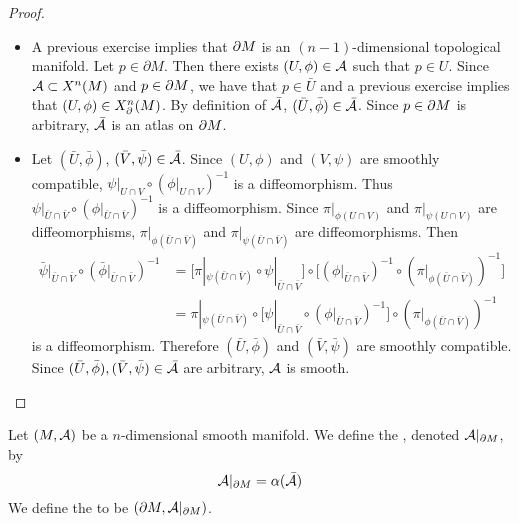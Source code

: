 \documentclass{book}
\begin{document}
\begin{proof}\
	\begin{itemize}
		\item A previous exercise implies that $\partial M$ is an $(n-1)$-dimensional topological manifold. Let $p \in \partial M$. Then there exists $(U, \phi) \in \mathcal{A}$ such that $p \in U$. Since $\mathcal{A} \subset X^n(M)$ and $p \in \partial M$, we have that $p \in \bar{U}$ and a previous exercise implies that $(U, \phi) \in X^n_{\partial}(M)$. By definition of $\bar{\mathcal{A}}$, $(\bar{U}, \bar{\phi}) \in \bar{\mathcal{A}}$. Since $p \in \partial M$ is arbitrary, $\bar{\mathcal{A}}$ is an atlas on $\partial M$. 
		
		
		\item Let $(\bar{U}, \bar{\phi})$, $(\bar{V}, \bar{\psi}) \in \bar{\mathcal{A}}$. Since $(U, \phi)$ and $(V, \psi)$ are smoothly compatible, $\psi|_{U \cap V} \circ (\phi|_{U \cap V})^{-1}$ is a diffeomorphism. Thus $\psi|_{\bar{U} \cap \bar{V}} \circ (\phi|_{\bar{U} \cap \bar{V}})^{-1}$ is a diffeomorphism. Since $\pi|_{\phi(U \cap V)}$ and $\pi|_{\psi(U \cap V)}$ are diffeomorphisms, $\pi|_{\phi(\bar{U} \cap \bar{V})}$ and $\pi|_{\psi(\bar{U} \cap \bar{V})}$ are diffeomorphisms. Then 
		\begin{align*}
			\bar{\psi}|_{\bar{U} \cap \bar{V}} \circ (\bar{\phi}|_{\bar{U} \cap \bar{V}})^{-1}
			& = \bigg[ \pi|_{\psi(\bar{U} \cap \bar{V})} \circ \psi|_{\bar{U} \cap \bar{V}} \bigg] \circ \bigg[ (\phi|_{\bar{U} \cap \bar{V}})^{-1} \circ( \pi|_{\phi(\bar{U} \cap \bar{V})})^{-1} \bigg] \\
			& =\pi|_{\psi(\bar{U} \cap \bar{V})} \circ \bigg[ \psi|_{\bar{U} \cap \bar{V}} \circ (\phi|_{\bar{U} \cap \bar{V}})^{-1} \bigg] \circ (\pi|_{\phi(\bar{U} \cap \bar{V})})^{-1}
		\end{align*}
		is a diffeomorphism. Therefore $(\bar{U}, \bar{\phi})$ and $(\bar{V}, \bar{\psi})$ are smoothly compatible. Since $(\bar{U}, \bar{\phi}), (\bar{V}, \bar{\psi}) \in \bar{\mathcal{A}}$ are arbitrary, $\mathcal{A}$ is smooth.
	\end{itemize}
\end{proof}

\begin{defn} 
	Let $(M, \mathcal{A})$ be a $n$-dimensional smooth manifold. We define the , denoted $\mathcal{A}|_{\partial M}$, by 
	$$\mathcal{A}|_{\partial M} = \alpha(\bar{\mathcal{A}})$$ 
	We define the  to be $(\partial M, \mathcal{A}|_{\partial M})$.
\end{defn}
\end{document}
